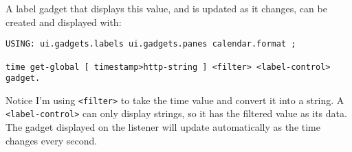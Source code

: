 A label gadget that displays this value, and is updated as it changes,
can be created and displayed with:

\begin{verbatim}
USING: ui.gadgets.labels ui.gadgets.panes calendar.format ;

time get-global [ timestamp>http-string ] <filter> <label-control> gadget.
\end{verbatim}

Notice I'm using \verb|<filter>| to take the time value and convert it into a string. A \verb|<label-control>| can only display strings, so it has the filtered value as its data. The gadget displayed on the listener will update automatically as the time changes every second.

